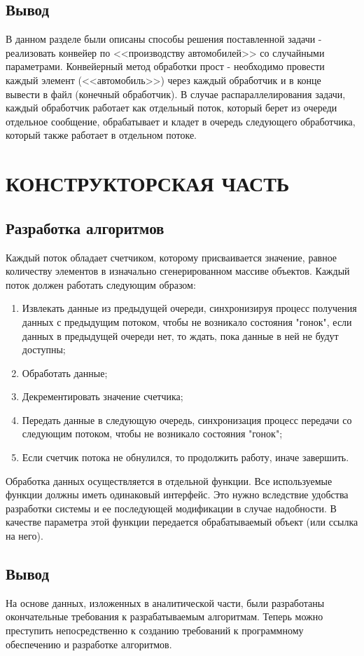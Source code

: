\documentclass[a4paper,12pt]{article}
\begin{document}
\newpage
\subsection{Вывод}
В данном разделе были описаны способы решения поставленной задачи - реализовать конвейер по <<производству автомобилей>> со случайными параметрами. Конвейерный метод обработки прост - необходимо провести каждый элемент (<<автомобиль>>) через каждый обработчик и в конце вывести в файл (конечный обработчик). В случае распараллелирования задачи, каждый обработчик работает как отдельный поток, который берет из очереди отдельное сообщение, обрабатывает и кладет в очередь следующего обработчика, который также работает в отдельном потоке.

\newpage
\section{КОНСТРУКТОРСКАЯ ЧАСТЬ}
\subsection{Разработка алгоритмов}
Каждый поток обладает счетчиком, которому присваивается значение, равное количеству элементов в изначально сгенерированном массиве объектов. 
Каждый поток должен работать следующим образом:
\begin{enumerate}
\item Извлекать данные из предыдущей очереди, синхронизируя процесс получения данных с предыдущим потоком, чтобы не возникало состояния "гонок", если данных в предыдущей очереди нет, то ждать, пока данные в ней не будут доступны;
\item Обработать данные;
\item Декрементировать значение счетчика;
\item Передать данные в следующую очередь, синхронизация процесс передачи со следующим потоком, чтобы не возникало состояния "гонок";
\item Если счетчик потока не обнулился, то продолжить работу, иначе завершить.
\end{enumerate}

Обработка данных осуществляется в отдельной функции. Все используемые функции должны иметь одинаковый интерфейс. Это нужно вследствие удобства разработки системы и ее последующей модификации в случае надобности.
В качестве параметра этой функции передается обрабатываемый объект (или ссылка на него).

\newpage
\subsection{Вывод}
На основе данных, изложенных в аналитической части, были разработаны окончательные требования к разрабатываемым алгоритмам. Теперь можно преступить непосредственно к созданию требований к программному обеспечению и разработке алгоритмов.
\end{document}
